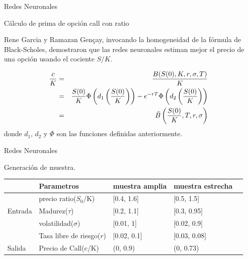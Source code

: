 \documentclass{beamer}
\begin{document}
\begin{frame}{Redes Neuronales}

    \begin{block}{C\'alculo de prima de opci\'on call con ratio}
        
        Rene Garcia y Ramazan Gen\c{c}ay, invocando la homogeneidad de la f\'ormula de Black-Scholes,
        demostraron que las redes neuronales estiman mejor el precio de una opci\'on usando el cociente $S/K$.

        \begin{eqnarray}
            \frac{c}{K} &=& \frac{B(S(0),K,r,\sigma,T)}{K}\\
            & =& \frac{S(0)}{K}\Phi\left(d_1\left(\frac {S(0)}K\right)\right) - e^{-rT}\Phi\left(d_2\left(\frac {S(0)}K\right)\right)\\
              & =& \tilde B\left(\frac{S(0)}K, T, r, \sigma\right)\notag
            \label{c2}
        \end{eqnarray}
%
        donde $d_1$, $d_2$ y $\Phi$ son las funciones definidas anteriormente.


    \end{block}

\end{frame}

\begin{frame}{Redes Neuronales}

  Generaci\'on de muestra.

    \begin{table}[!htbp]
        \begin{center}
        \begin{tabular}{|l|l|l|l|l|}
            \hline
             & Parametros & muestra amplia  &  muestra estrecha   \\ \hline
              & precio ratio($S_0$/K) & [0.4, 1.6] & [0.5, 1.5]   \\ \cline{2-4} 
             Entrada & Madurez($\tau$) &  [0.2, 1.1] & [0.3, 0.95]   \\ \cline{2-4} 
              & volatilidad($\sigma$) &  [0.01, 1] & [0.02, 0.9]  \\ \cline{2-4} 
              & Tasa libre de riesgo($r$) &  [0.02, 0.1] & [0.03, 0.08] \\ \hline
             Salida & Precio de Call(c/K) &  (0, 0.9) & (0, 0.73) \\ \hline
        \end{tabular}
        \end{center}
    \end{table} 

  

\end{frame}
\end{document}
